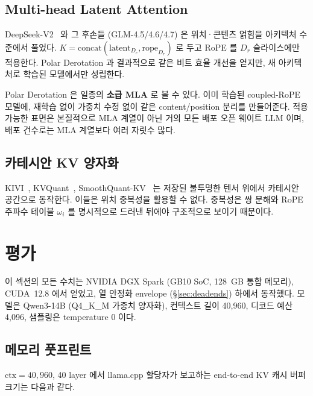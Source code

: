\documentclass[10pt,twocolumn]{article}
\begin{document}
\subsection{Multi-head Latent Attention}

DeepSeek-V2~\cite{deepseekv2} 와 그 후손들 (GLM-4.5/4.6/4.7) 은 위치·콘텐츠 얽힘을 아키텍처 수준에서 풀었다. $K = \text{concat}(\text{latent}_{D_c},\text{rope}_{D_r})$ 로 두고 RoPE 를 $D_r$ 슬라이스에만 적용한다. Polar Derotation 과 결과적으로 같은 비트 효율 개선을 얻지만, 새 아키텍처로 학습된 모델에서만 성립한다.

Polar Derotation 은 일종의 \textbf{소급 MLA} 로 볼 수 있다. 이미 학습된 coupled-RoPE 모델에, 재학습 없이 가중치 수정 없이 같은 content/position 분리를 만들어준다. 적용 가능한 표면은 본질적으로 MLA 계열이 아닌 거의 모든 배포 오픈 웨이트 LLM 이며, 배포 건수로는 MLA 계열보다 여러 자릿수 많다.

\subsection{카테시안 KV 양자화}

KIVI~\cite{kivi2024}, KVQuant~\cite{kvquant2024}, SmoothQuant-KV~\cite{smoothquant2023} 는 저장된 불투명한 텐서 위에서 카테시안 공간으로 동작한다. 이들은 위치 중복성을 활용할 수 없다. 중복성은 쌍 분해와 RoPE 주파수 테이블 $\omega_i$ 를 명시적으로 드러낸 뒤에야 구조적으로 보이기 때문이다.

\section{평가}
\label{sec:eval}

이 섹션의 모든 수치는 NVIDIA DGX Spark (GB10 SoC, 128~GB 통합 메모리), CUDA~12.8 에서 얻었고, 열 안정화 envelope (\S\ref{sec:deadends}) 하에서 동작했다. 모델은 Qwen3-14B (Q4\_K\_M 가중치 양자화), 컨텍스트 길이 40,960, 디코드 예산 4,096, 샘플링은 temperature $0$ 이다.

\subsection{메모리 풋프린트}

$\text{ctx}=40{,}960$, 40 layer 에서 llama.cpp 할당자가 보고하는 end-to-end KV 캐시 버퍼 크기는 다음과 같다.
\end{document}

